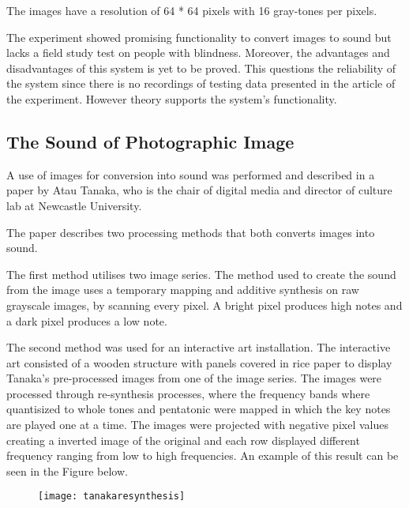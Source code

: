   
The images have a resolution of 64 * 64 pixels with 16 gray-tones per pixels.  

The experiment showed promising functionality to convert images to sound but lacks a field study test on people with blindness. Moreover, the advantages and disadvantages of this system is yet to be proved. This questions the reliability of the system since there is no recordings of testing data presented in the article of the experiment. However theory supports the system's functionality.  

\subsection{The Sound of Photographic Image}\label{sec:soundarticle}

A use of images for conversion into sound was performed and described in a paper by Atau Tanaka, who is the chair of digital media and director of culture lab at Newcastle University.

The paper describes two processing methods that both converts images into sound.

The first method utilises two image series. The method used to create the sound from the image uses a temporary mapping and additive synthesis on raw grayscale images, by scanning every pixel. A bright pixel produces high notes and a dark pixel produces a low note. 

The second method was used for an interactive art installation. The interactive art consisted of a wooden structure with panels covered in rice paper to display Tanaka's pre-processed images from one of the image series. The images were processed through re-synthesis processes, where the frequency bands where quantisized to whole tones and pentatonic were mapped in which the key notes are played one at a time. The images were projected with negative pixel values creating a inverted image of the original and each row displayed different frequency ranging from low to high frequencies. An example of this result can be seen in the Figure below.  

\begin{figure}[!h]
\centering
\texttt{[image: tanakaresynthesis]}
\caption{\label{fig:tanakaresynthesis}}
\end{figure}


